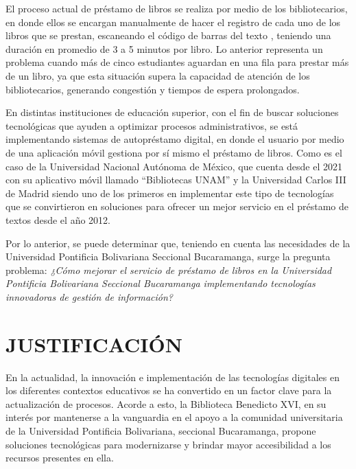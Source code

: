 \documentclass[spanish]{ieee_upb}
\begin{document}
El  proceso actual de préstamo de libros se realiza por medio de los bibliotecarios, en donde ellos se encargan manualmente de hacer el registro de cada uno de los libros que se prestan, escaneando el código de barras del texto , teniendo una duración en promedio de 3 a 5 minutos por libro. Lo anterior representa un problema cuando más de cinco estudiantes aguardan en una fila para prestar más de un libro, ya que esta situación supera la capacidad de atención de los bibliotecarios, generando congestión y tiempos de espera prolongados.
\vspace{0.3 cm}

En distintas instituciones de educación superior, con el fin de buscar soluciones tecnológicas que ayuden a optimizar procesos administrativos, se está implementando sistemas de autopréstamo digital, en donde el usuario por medio de una aplicación móvil gestiona por sí mismo el préstamo de libros. Como es el caso de la Universidad Nacional Autónoma de México, que cuenta desde el 2021 con su aplicativo móvil llamado “Bibliotecas UNAM” y la Universidad Carlos III de Madrid siendo uno de los primeros en implementar este tipo de tecnologías que se convirtieron en soluciones para ofrecer un mejor servicio en el préstamo de textos desde el año 2012.
\vspace{0.3 cm}

Por lo anterior, se puede determinar que, teniendo en cuenta las necesidades de la Universidad Pontificia Bolivariana Seccional Bucaramanga, surge la pregunta problema: \textit{¿Cómo mejorar el servicio de préstamo de libros en la Universidad Pontificia Bolivariana Seccional Bucaramanga implementando tecnologías innovadoras de gestión de información?}


\newpage
\section{JUSTIFICACIÓN}

En la actualidad, la innovación e implementación de las tecnologías digitales en los diferentes contextos educativos se ha convertido en un factor clave para la actualización de procesos. Acorde a esto, la Biblioteca Benedicto XVI, en su interés por mantenerse a la vanguardia en el apoyo a la comunidad universitaria de la Universidad Pontificia Bolivariana, seccional Bucaramanga, propone soluciones tecnológicas para modernizarse y brindar mayor accesibilidad a los recursos presentes en ella.
\vspace{0.3 cm}
\end{document}
